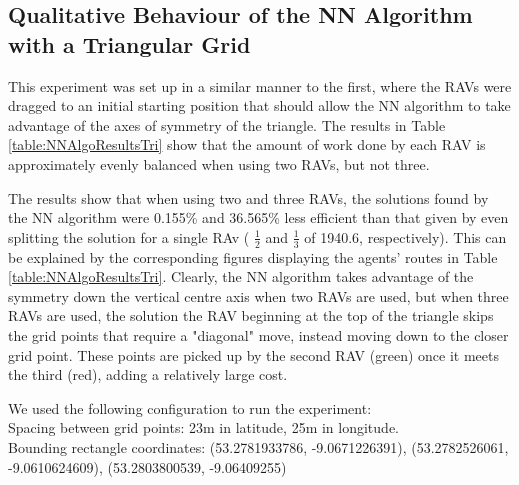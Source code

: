 \pagebreak
\subsection{Qualitative Behaviour of the NN Algorithm with a Triangular Grid}
This experiment was set up in a similar manner to the first, where the RAVs were dragged to an initial starting position that should allow the NN algorithm to take advantage of the axes of symmetry of the triangle.
The results in Table \ref{table:NNAlgoResultsTri} show that the amount of work done by each RAV is approximately evenly balanced when using two RAVs, but not three. 

The results show that when using two and three RAVs, the solutions found by the NN algorithm were 0.155\% and 36.565\% less efficient than that given by even splitting the solution for a single RAv ( $\frac{1}{2}$ and $\frac{1}{3}$ of 1940.6, respectively). This can be explained by the corresponding figures displaying the agents' routes in Table \ref{table:NNAlgoResultsTri}. Clearly, the NN algorithm takes advantage of the symmetry down the vertical centre axis when two RAVs are used, but when three RAVs are used, the solution the RAV beginning at the top of the triangle skips the grid points that require a "diagonal" move, instead moving down to the closer grid point. These points are picked up by the second RAV (green) once it meets the third (red), adding a relatively large cost.

We used the following configuration to run the experiment:
\\Spacing between grid points: 23m in latitude, 25m in longitude.
\\Bounding rectangle coordinates: (53.2781933786, -9.0671226391), (53.2782526061, -9.0610624609), (53.2803800539, -9.06409255)
\\


